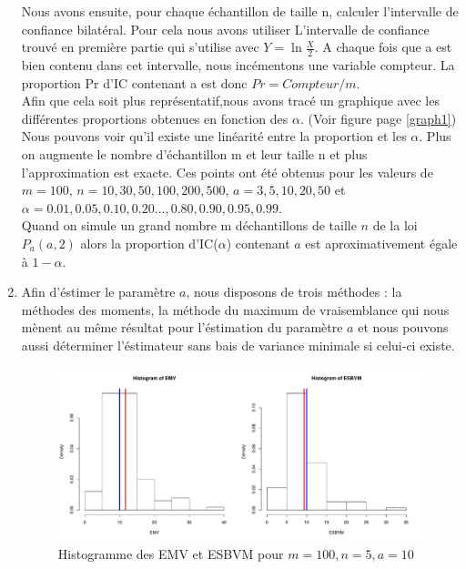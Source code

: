 \documentclass[12pt]{article}
\newcommand{\dsp}{\displaystyle}
\begin{document}
\begin{enumerate}
Nous avons ensuite, pour chaque \'{e}chantillon de taille n, calculer l'intervalle de confiance bilat\'{e}ral. Pour cela nous avons utiliser L'intervalle de confiance trouv\'{e} en premi\`{e}re partie qui s'utilise avec $Y=\ln {\dsp \frac{X}{2}}$.  A chaque fois que a est bien contenu dans cet intervalle, nous inc\'{e}mentons une variable compteur. La proportion Pr d'IC contenant a est donc $Pr = Compteur/m$.
\\
Afin que cela soit plus repr\'{e}sentatif,nous avons trac\'{e} un graphique avec les diff\'{e}rentes proportions obtenues en fonction des $\alpha$. (Voir figure page \ref{graph1})
\\

Nous pouvons voir qu'il existe une lin\'{e}arit\'{e} entre la proportion et les $\alpha$. Plus on augmente le nombre d'\'{e}chantillon m et leur taille n et plus l'approximation est exacte. Ces points ont \'{e}t\'{e} obtenus pour les valeurs de $m = 100$, $n = 10, 30, 50, 100, 200, 500$, $a = 3, 5, 10, 20, 50$ et $\alpha = 0.01, 0.05, 0.10, 0.20 ..., 0.80, 0.90, 0.95, 0.99$.
\\
Quand on simule un grand nombre m d\'{e}chantillons de taille $n$ de la  loi $P_a(a,2)$ alors la proportion d'IC($\alpha$) contenant $a$ est aproximativement \'{e}gale \`{a}  $1 - \alpha$.
\\

\item
 Afin d'\'{e}stimer le param\`{e}tre $a$, nous disposons de trois m\'{e}thodes : la m\'{e}thodes des moments, la m\'{e}thode du maximum de vraisemblance qui nous m\`{e}nent au m\^{e}me r\'{e}sultat pour l'\'{e}stimation du param\`{e}tre $a$ et nous pouvons aussi d\'{e}terminer l'\'{e}stimateur sans bais de variance minimale si celui-ci existe.
\\

\begin{figure}[!h]
\centering
\includegraphics[width=1.0\textwidth]{figures/GraphP2Q31.pdf}
\caption{Histogramme des EMV et ESBVM pour $m=100, n=5, a=10$}
\end{figure}


\end{enumerate}
\end{document}
